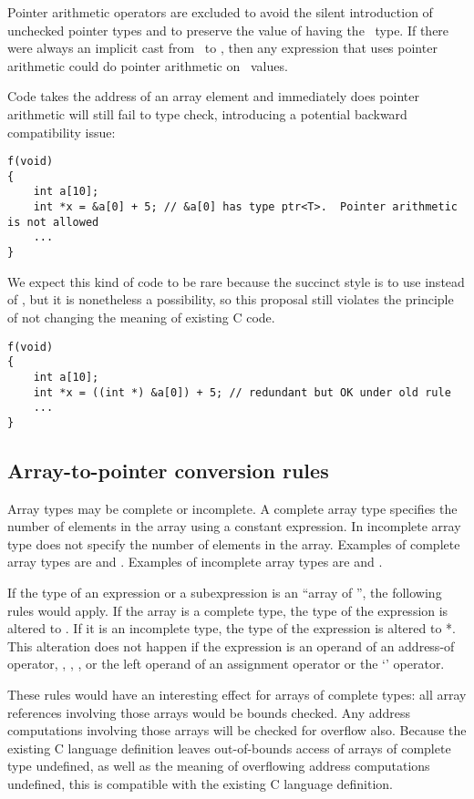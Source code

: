 Pointer arithmetic operators are excluded to avoid the silent
introduction of unchecked pointer types and to preserve the value of having
the \ptrT\ type. If
there were always an implicit cast from \ptrT\ to \uncheckedptrT,
then any expression that uses pointer arithmetic could do pointer
arithmetic on \ptrT\
values.

Code takes the address of an array element and immediately does pointer
arithmetic will still fail to type check, introducing a potential
backward compatibility issue:
\begin{lstlisting}
f(void)
{
    int a[10];
    int *x = &a[0] + 5; // &a[0] has type ptr<T>.  Pointer arithmetic is not allowed
    ...
}
\end{lstlisting}

We expect this kind of code to be rare because the succinct style is to
use \code{a} instead of \code{&a[0]}, but it is nonetheless a
possibility, so this proposal still violates the principle of not
changing the meaning of existing C code.

\begin{lstlisting}
f(void)
{
    int a[10];
    int *x = ((int *) &a[0]) + 5; // redundant but OK under old rule
    ...
}
\end{lstlisting}

\subsection{Array-to-pointer conversion rules}

Array types may be complete or incomplete. A complete array type
specifies the number of elements in the array using a constant
expression. In incomplete array type does not specify the number of
elements in the array. Examples of complete array types are 
and . Examples of incomplete array types are
 and .

If the type of an expression or a subexpression is an ``array of
\var{T}'', the following rules would apply. If the array is a complete
type, the type of the expression is altered to
\arrayptrT. If it is
an incomplete type, the type of the expression is altered to  *.
This alteration does not happen if the expression is an operand of an
address-of operator, \code{++}, \code{--}, \code{sizeof}, or the
left operand of an assignment operator or the `\code{.}' operator.

These rules would have an interesting effect for arrays of complete
types: all array references involving those arrays would be bounds
checked. Any address computations involving those arrays will be checked
for overflow also. Because the existing C language definition leaves
out-of-bounds access of arrays of complete type undefined, as well as
the meaning of overflowing address computations undefined, this is
compatible with the existing C language definition.

